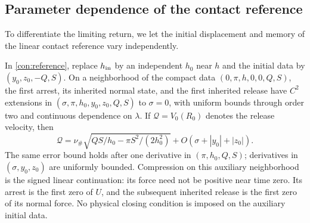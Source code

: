 \subsection{Parameter dependence of the contact reference}

To differentiate the limiting return, we let the initial displacement
and memory of the linear contact reference vary independently.

\begin{lemma}
\label{con:reference-regularity}
In \eqref{con:reference}, replace $h_{\rm in}$ by an independent
$h_0$ near $h$ and the initial data by $(y_0,z_0,-Q,S)$.
On a neighborhood of the compact data
$(0,\pi,h,0,0,Q,S)$, the first arrest, its inherited normal state,
and the first inherited release have $C^2$ extensions in
$(\sigma,\pi,h_0,y_0,z_0,Q,S)$ to $\sigma=0$, with uniform bounds
through order two and continuous dependence on $\lambda$.
If $\mathcal Q=V_0(R_0)$ denotes the release velocity, then
\begin{equation}
 \mathcal Q=
 \nu_\#\sqrt{QS/h_0-\pi S^2/(2h_0^2)}
       +O(\sigma+|y_0|+|z_0|).
 \label{con:reference-amplitude-regularity}
\end{equation}
The same error bound holds after one derivative in
$(\pi,h_0,Q,S)$; derivatives in $(\sigma,y_0,z_0)$ are uniformly
bounded.  Compression on this auxiliary neighborhood is the signed
linear continuation: its force need not be positive near time zero.
Its arrest is the first zero of $U$, and the subsequent inherited
release is the first zero of its normal force.  No physical closing
condition is imposed on the auxiliary initial data.
\end{lemma}
